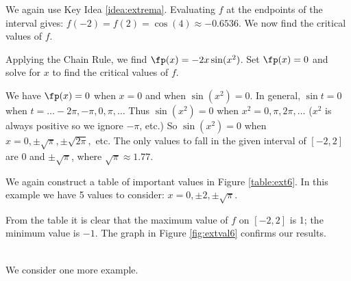 {We again use Key Idea \ref{idea:extrema}. Evaluating $f$ at the endpoints of the interval gives: $f(-2) = f(2) = \cos (4) \approx -0.6536.$ We now find the critical values of $f$.

Applying the Chain Rule, we find $\fp(x) = -2x\sin (x^2)$. Set $\fp(x) = 0$ and solve for $x$ to find the critical values of $f$. 

We have $\fp(x) = 0$ when $x = 0$ and when $\sin (x^2) = 0$. In general, $\sin t = 0$ when $t = \ldots -2\pi, -\pi, 0, \pi, \ldots$ Thus $\sin (x^2) = 0$ when $x^2 = 0, \pi, 2\pi, \ldots$ ($x^2$ is always positive so we ignore $-\pi$, etc.) So $\sin (x^2)=0$ when $x= 0, \pm \sqrt{\pi}, \pm\sqrt{2\pi},$ etc. The only values to fall in the given interval of $[-2,2]$ are $0$ and $\pm\sqrt{\pi}$, where $\sqrt{\pi} \approx 1.77$.

We again construct a table of important values in Figure \ref{table:ext6}. In this example we have 5 values to consider: $x= 0, \pm 2, \pm\sqrt{\pi}$. 


From the table it is clear that the maximum value of $f$ on $[-2,2]$ is 1; the minimum value is $-1$. The graph in Figure \ref{fig:extval6} confirms our results.
}\\

We consider one more example.\\


